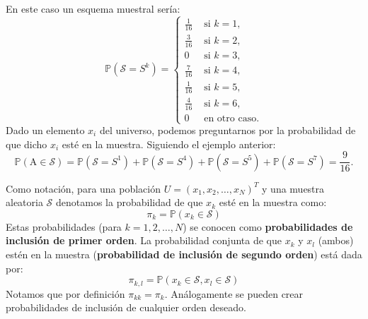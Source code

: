 \documentclass[
]{book}
\begin{document}
En este caso un esquema muestral sería:
\[
\mathbb{P}(\mathcal{S} = S^k) = \begin{cases}
\frac{1}{16} & \text{ si } k = 1, \\
\frac{3}{16} & \text{ si } k = 2, \\
0 & \text{ si } k = 3, \\
\frac{7}{16} & \text{ si } k = 4, \\
\frac{1}{16} & \text{ si } k = 5, \\
\frac{4}{16} & \text{ si } k = 6, \\
0   & \text{ en otro caso.}
\end{cases}
\]
Dado un elemento \(x_i\) del universo, podemos preguntarnos por la probabilidad de que dicho \(x_i\) esté en la muestra. Siguiendo el ejemplo anterior:
\[
\mathbb{P}(\text{A} \in \mathcal{S}) = \mathbb{P}(\mathcal{S} = S^1) + \mathbb{P}(\mathcal{S} = S^4) + \mathbb{P}(\mathcal{S} = S^5) + \mathbb{P}(\mathcal{S} = S^7) = \frac{9}{16}.
\]

Como notación, para una población \(U = (x_1, x_2, \dots, x_N)^T\) y una muestra aleatoria \(\mathcal{S}\) denotamos la probabilidad de que \(x_k\) esté en la muestra como:
\[
\pi_k = \mathbb{P}(x_k \in \mathcal{S})
\]
Estas probabilidades (para \(k = 1,2,\dots, N\)) se conocen como \textbf{probabilidades de inclusión de primer orden}. La probabilidad conjunta de que \(x_k\) y \(x_l\) (ambos) estén en la muestra (\textbf{probabilidad de inclusión de segundo orden}) está dada por:
\[
\pi_{k,l} = \mathbb{P}(x_k \in \mathcal{S}, x_l \in \mathcal{S})
\]
Notamos que por definición \(\pi_{kk} = \pi_k\). Análogamente se pueden crear probabilidades de inclusión de cualquier orden deseado.
\end{document}
